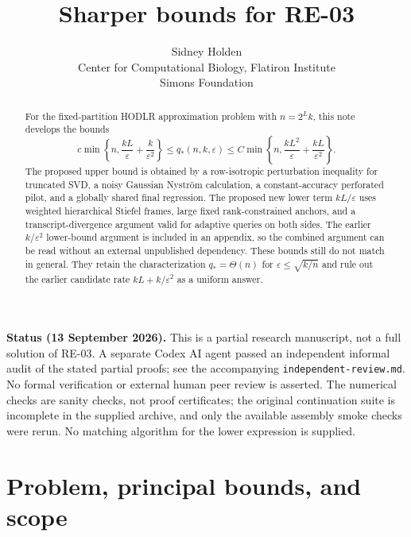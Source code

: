 \documentclass[11pt]{article}
\title{Sharper bounds for RE-03}
\author{Sidney Holden\\{\small Center for Computational Biology, Flatiron Institute}\\{\small Simons Foundation}}
\date{}
\theoremstyle{remark}
\newcommand{\eps}{\varepsilon}
\begin{document}
\maketitle
\vspace{-1.6em}
\begin{abstract}
For the fixed-partition HODLR approximation problem with $n=2^Lk$, this note
develops the bounds
\[
 c\min\left\{n,\frac{kL}{\eps}+\frac{k}{\eps^2}\right\}
 \le q_*(n,k,\eps)\le
 C\min\left\{n,\frac{kL^2}{\eps}+\frac{kL}{\eps^2}\right\}.
\]
The proposed upper bound is obtained by a row-isotropic perturbation inequality
for truncated SVD, a noisy Gaussian Nystr\"om calculation, a constant-accuracy perforated pilot, and a globally shared final regression. The proposed new lower term $kL/\eps$ uses weighted
hierarchical Stiefel frames, large fixed rank-constrained anchors, and a
transcript-divergence argument valid for adaptive queries on both sides.
The earlier $k/\eps^2$ lower-bound argument is included in an appendix, so the
combined argument can be read without an external unpublished dependency.
These bounds still do not match in general. They retain the characterization
$q_* = \Theta(n)$ for $\eps\le\sqrt{k/n}$ and rule out the earlier candidate
rate $kL+k/\eps^2$ as a uniform answer.
\end{abstract}

\textbf{Status (13 September 2026).} This is a partial research manuscript,
not a full solution of RE-03. A separate Codex AI agent passed an independent
informal audit of the stated partial proofs; see the accompanying
\texttt{independent-review.md}. No formal verification or external human peer
review is asserted. The numerical checks are sanity checks, not proof
certificates; the original continuation suite is incomplete in the supplied
archive, and only the available assembly smoke checks were rerun.
No matching algorithm for the lower expression is supplied.

\clearpage
\begingroup\small\setlength{\parskip}{0pt}\tableofcontents\endgroup
\clearpage

\section{Problem, principal bounds, and scope}
\end{document}
